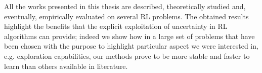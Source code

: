 All the works presented in this thesis are described, theoretically studied and, eventually, empirically evaluated on several RL problems. The obtained results highlight the benefits that the explicit exploitation of uncertainty in RL algorithms can provide; indeed we show how in a large set of problems that have been chosen with the purpose to highlight particular aspect we were interested in, e.g. exploration capabilities, our methods prove to be more stable and faster to learn than others available in literature.
